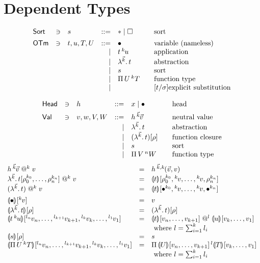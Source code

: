 \documentclass[a4paper]{article}
\makeatletter
\newcommand{\OTm}{\mathsf{OTm}}
\newcommand{\oann}[1]{{}^{#1}\kern-0.15ex}
\newcommand{\ovar}{\mathord{\bullet}}
\newcommand{\oapp}[1]{\,\oann{#1}}
\newcommand{\olam}[1]{\lambda^{#1}.\,}
\newcommand{\opi}[2]{\Pi\,#1\,^{#2}}
\renewcommand{\esubst}[2]{#1[#2]}
\newcommand{\Head}{\mathsf{Head}}
\newcommand{\vapp}[1]{\mathrel{@^{#1}}}
\renewcommand{\eval}[2]{\dent{#1}{}[#2]}
\makeatother
\begin{document}
\section{Dependent Types}

\[
\begin{array}{lllrl@{\qquad}l}
\Sort & \ni & s & ::= & \ttype \mid \tkind & \mbox{sort} \\[1ex]
\OTm & \ni & t,u,T,U & ::= & \ovar & \mbox{variable (nameless)} \\
&&& \mid & t \oapp k u & \mbox{application} \\
&&& \mid & \olam {\vec k} t & \mbox{abstraction} \\
&&& \mid & s & \mbox{sort} \\
&&& \mid & \opi U k T & \mbox{function type} \\
&&& \mid & \subst t \sigma & \mbox{explicit substitution} \\
\end{array}
\]

\[
\begin{array}{lllrl@{\qquad}l}
\Head & \ni & h & ::= & x \mid \ovar & \mbox{head} \\[1ex]
\Val & \ni & v,w,V,W & ::= & h \oapp {\vec k} {\vec v} & \mbox{neutral
  value} \\
&&& \mid & \olam {\vec k} t & \mbox{abstraction} \\
&&& \mid & \esubst{(\olam {\vec k} t)}{\rho} & \mbox{function closure} \\
&&& \mid & s & \mbox{sort} \\
&&& \mid & \opi V n W & \mbox{function type} \\
\end{array}
\]
\[
\begin{array}{lll}
  h \oapp {\vec k} {\vec v} \vapp k v 
    & = & h \oapp{\vec k,k} {(\vec v,v)} \\
  \esubst{\olam {\vec k} t}{\rho_0^{k_0},\dots,\rho_n^{k_n}} \vapp k v
    & = & \eval t
    {\rho_0^{k_0},\oann{k}v,\dots,\oann{k}v,\rho_n^{k_n}}
\\
  (\olam {\vec k} t) \vapp k v
    & = & \eval t
    {\ovar^{k_0},\oann{k}v,\dots,\oann{k}v,\ovar^{k_n}}
\\[1ex]
  \eval \ovar {\oann k v} & = & v \\
  \eval {\olam{\vec k}t} \rho & = & \esubst {(\olam{\vec k}t)} \rho
  \\
  \eval {t \oapp k u} {\oann{l_n}v_n,\dots,\oann{l_{k+1}}v_{k+1},
                       \oann{l_k}v_k,\dots,\oann{l_1}v_1} 
    & = & \eval t {v_n,\dots,v_{k+1}} \vapp l \eval u {v_k,\dots,v_1}
\\ &&      \mbox{ where } l = \sum_{i=1}^k l_i \\
  \eval s \rho & = & s \\
  \eval {\opi U k T} {\oann{l_n}v_n,\dots,\oann{l_{k+1}}v_{k+1},
                       \oann{l_k}v_k,\dots,\oann{l_1}v_1} 
    & = & \opi {\eval U {v_n,\dots,v_{k+1}}} l {\eval T {v_k,\dots,v_1}}
\\ &&      \mbox{ where } l = \sum_{i=1}^k l_i \\
\end{array}
\]
\end{document}
